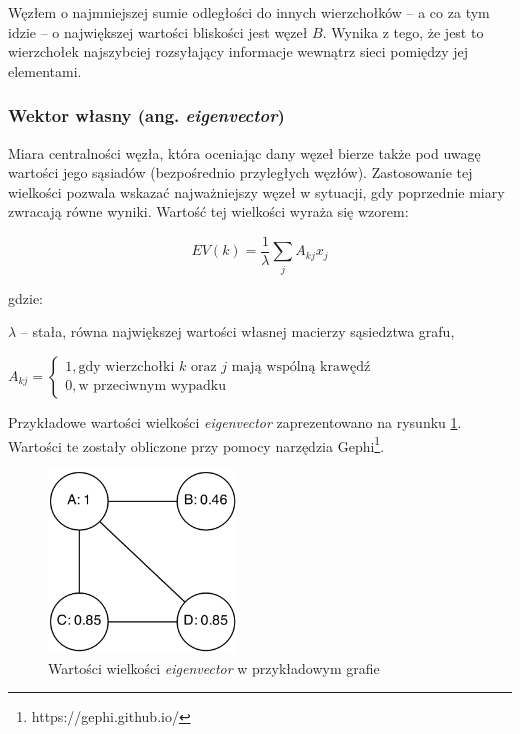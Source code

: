 Węzłem o najmniejszej sumie odległości do innych wierzchołków -- a co za tym idzie --
o największej wartości bliskości jest węzeł $B$. Wynika z tego, że jest to
wierzchołek najszybciej rozsyłający informacje wewnątrz sieci pomiędzy jej elementami. 


\clearpage
\subsubsection{Wektor własny (ang. \textit{eigenvector})}
Miara centralności węzła,  która oceniając dany węzeł bierze także pod uwagę 
wartości jego sąsiadów (bezpośrednio przyległych węzłów).
Zastosowanie tej wielkości pozwala wskazać najważniejszy węzeł w sytuacji,
gdy poprzednie miary zwracają równe wyniki. Wartość tej wielkości wyraża się
wzorem:

\begin{equation}
EV(k) = \frac{1}{\lambda}\sum\limits_{j}A_{kj}x_j
\end{equation}

gdzie:

$\lambda$ -- stała, równa największej wartości własnej macierzy sąsiedztwa grafu,

\begin{math}
 A_{kj} =
  \begin{cases}
   1, \text{gdy wierzchołki $k$ oraz $j$ mają wspólną krawędź} \\
   0, \text{w przeciwnym wypadku}
  \end{cases}

\end{math}


\bigskip

Przykładowe wartości wielkości \textit{eigenvector}
zaprezentowano na rysunku \ref{image:eigenvector}. Wartości te zostały
obliczone przy pomocy narzędzia Gephi\footnote{https://gephi.github.io/}.

\begin{figure}[ht!]
\centering
\includegraphics[width=50mm]{img/eigenvector.png}
\caption{Wartości wielkości \textit{eigenvector} w przykładowym grafie}
\label{image:eigenvector}
\end{figure}



